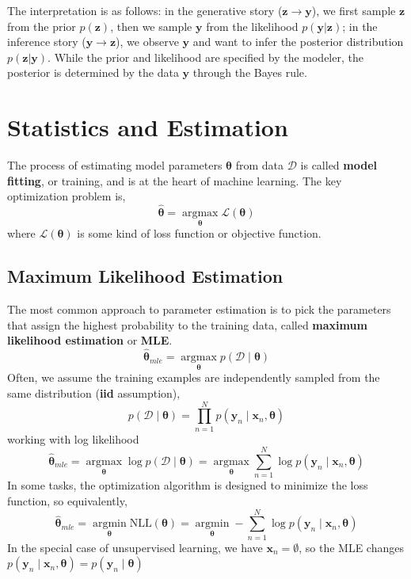 \documentclass[11pt]{article}
\begin{document}
The interpretation is as follows: in the generative story ($\boldsymbol{z} \rightarrow \boldsymbol{y}$), we first sample $\boldsymbol{z}$ from the prior $p(\boldsymbol{z})$, then we sample $\boldsymbol{y}$ from the likelihood $p(\boldsymbol{y} | \boldsymbol{z})$; in the inference story ($\boldsymbol{y} \rightarrow \boldsymbol{z}$), we observe $\boldsymbol{y}$ and want to infer the posterior distribution $p(\boldsymbol{z} | \boldsymbol{y})$.
While the prior and likelihood are specified by the modeler, the posterior is determined by the data $\boldsymbol{y}$ through the Bayes rule.

\clearpage
\section{Statistics and Estimation}
The process of estimating model parameters $\boldsymbol{\theta}$ from data $\mathcal{D}$ is called \textbf{model fitting}, or training, and is at the heart of machine learning.
The key optimization problem is,
\[
\hat{\boldsymbol{\theta}} = \operatorname*{argmax}_{\boldsymbol{\theta}} \mathcal{L}(\boldsymbol{\theta})
\]
where $\mathcal{L}(\boldsymbol{\theta})$ is some kind of loss function or objective function.

\subsection{Maximum Likelihood Estimation}
The most common approach to parameter estimation is to pick the parameters that assign the highest
probability to the training data, called \textbf{maximum likelihood estimation} or \textbf{MLE}.
\[
\hat{\boldsymbol{\theta}}_{mle} = \operatorname*{argmax}_{\boldsymbol{\theta}} p(\mathcal{D} \mid \boldsymbol{\theta})
\]
Often, we assume the training examples are independently sampled from the same distribution (\textbf{iid} assumption),
\[
p(\mathcal{D} \mid \boldsymbol{\theta}) = \prod_{n=1}^N p(\mathbf{y}_n \mid \mathbf{x}_n, \boldsymbol{\theta})
\]
working with log likelihood 
\[
\hat{\boldsymbol{\theta}}_{mle} = \operatorname*{argmax}_{\boldsymbol{\theta}} \log p(\mathcal{D} \mid \boldsymbol{\theta}) = \operatorname*{argmax}_{\boldsymbol{\theta}} \sum_{n=1}^N \log p(\mathbf{y}_n \mid \mathbf{x}_n, \boldsymbol{\theta})
\]
In some tasks, the optimization algorithm is designed to minimize the loss function, so equivalently,
\[
\hat{\boldsymbol{\theta}}_{mle} = \operatorname*{argmin}_{\boldsymbol{\theta}} \text{NLL}(\boldsymbol{\theta}) = \operatorname*{argmin}_{\boldsymbol{\theta}} - \sum_{n=1}^N \log p(\mathbf{y}_n \mid \mathbf{x}_n, \boldsymbol{\theta})
\]
In the special case of unsupervised learning, we have $\mathbf{x}_n = \emptyset$, so the MLE changes $p(\mathbf{y}_n \mid \mathbf{x}_n, \boldsymbol{\theta}) = p(\mathbf{y}_n \mid \boldsymbol{\theta})$
\end{document}

